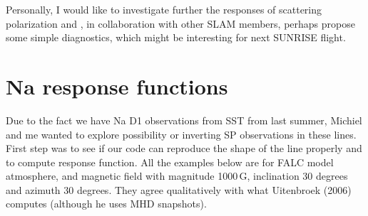 \documentclass[a4paper,10pt]{article}
\begin{document}
Personally, I would like to investigate further the responses of scattering polarization and , in collaboration with other SLAM members, perhaps propose some simple diagnostics, which might be interesting for next SUNRISE flight. 

\newpage

\section{Na response functions}

Due to the fact we have Na D1 observations from SST from last summer, Michiel and me wanted to explore possibility or inverting SP observations in these lines. First step was to see if our code can reproduce the shape of the line properly and to compute response function. All the examples below are for FALC model atmosphere, and magnetic field  with magnitude 1000\,G, inclination 30 degrees and azimuth 30 degrees. They agree qualitatively with what Uitenbroek (2006) computes (although he uses MHD snapshots).
\end{document}
